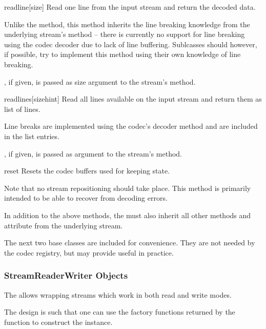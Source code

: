 \begin{methoddesc}{readline}{[size]}
  Read one line from the input stream and return the
  decoded data.

  Unlike the  method, this method inherits
  the line breaking knowledge from the underlying stream's
   method -- there is currently no support for line
  breaking using the codec decoder due to lack of line buffering.
  Sublcasses should however, if possible, try to implement this method
  using their own knowledge of line breaking.

  , if given, is passed as size argument to the stream's
   method.
\end{methoddesc}

\begin{methoddesc}{readlines}{[sizehint]}
  Read all lines available on the input stream and return them as list
  of lines.

  Line breaks are implemented using the codec's decoder method and are
  included in the list entries.

  , if given, is passed as  argument to the
  stream's  method.
\end{methoddesc}

\begin{methoddesc}{reset}{}
  Resets the codec buffers used for keeping state.

  Note that no stream repositioning should take place.  This method is
  primarily intended to be able to recover from decoding errors.
\end{methoddesc}

In addition to the above methods, the  must also
inherit all other methods and attribute from the underlying stream.

The next two base classes are included for convenience. They are not
needed by the codec registry, but may provide useful in practice.


\subsubsection{StreamReaderWriter Objects \label{stream-reader-writer}}

The  allows wrapping streams which work in
both read and write modes.

The design is such that one can use the factory functions returned by
the  function to construct the instance.

